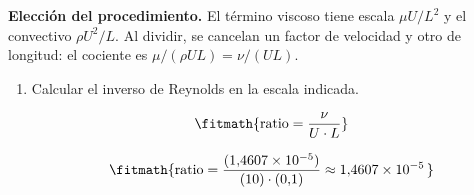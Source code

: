 \noindent\textbf{Elección del procedimiento.} El término viscoso tiene escala $\mu U/L^2$ y el convectivo $\rho U^2/L$. Al dividir, se cancelan un factor de velocidad y otro de longitud: el cociente es $\mu/(\rho UL)=\nu/(UL)$.

\begin{enumerate}

\item Calcular el inverso de Reynolds en la escala indicada.

\[\fitmath{\mathrm{ratio}=\frac{\nu}{U\cdot L}}\]

\[\fitmath{\mathrm{ratio}=\frac{(1{,}4607\times10^{-5})}{(10)\cdot (0{,}1)}\approx 1{,}4607\times10^{-5}\,}\]

\end{enumerate}
